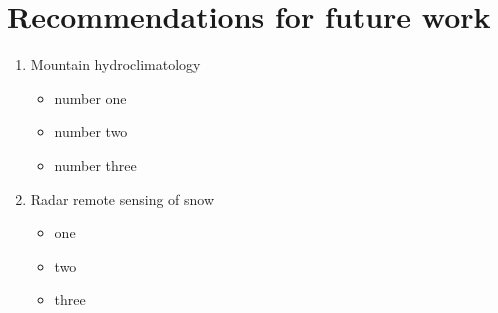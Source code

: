 \hypertarget{ch5-intro-1}{\section{Recommendations for future work}\label{ch5-intro-1}}

\begin{enumerate}
   \item Mountain hydroclimatology
   \begin{itemize}
    \item number one   
    
    \item number two
    
    \item number three
   \end{itemize}

   \item Radar remote sensing of snow
   \begin{itemize}
     \item one

     \item two

    \item three
    
   \end{itemize}
\end{enumerate}





